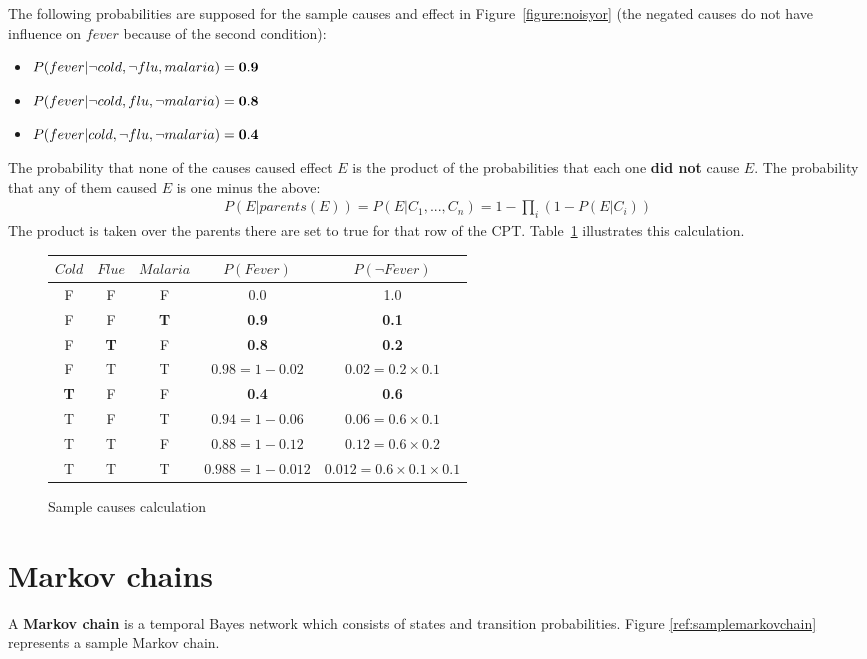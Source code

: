 \documentclass{report}
\begin{document}
The following probabilities are supposed for the sample causes and effect in Figure~\ref{figure:noisyor} (the negated causes do not have influence on $fever$ because of the second condition):
\begin{itemize}
\item $P(fever\vert \neg cold, \neg flu, malaria) = {\bf 0.9}$
\item $P(fever\vert \neg cold, flu, \neg malaria) = {\bf 0.8}$
\item $P(fever\vert cold, \neg flu, \neg malaria) = {\bf 0.4}$
\end{itemize}

The probability that none of the causes caused effect $E$ is the product of the probabilities that each one {\bf did not} cause $E$. The probability that any of them caused $E$ is one minus the above:
\begin{align*}
P(E\vert parents(E)) = P(E\vert C_1,...,C_n) = 1 - \prod_i (1 - P(E\vert C_i))
\end{align*}
The product is taken over the parents there are set to true for that row of the CPT. Table~\ref{table:samplecauses} illustrates this calculation.

\begin{figure}[h!]
\centering
\begin{tabular}{c|c|c||c||c}
$Cold$ & $Flue$ & $Malaria$ & $P(Fever)$ & $P(\neg Fever)$ \\
\hline
\hline
F & F & F & 0.0 & 1.0 \\
F & F & {\bf T} & {\bf 0.9} & {\bf 0.1} \\
F & {\bf T} & F & {\bf 0.8} & {\bf 0.2} \\
F & T & T & $0.98 = 1 - 0.02$ & $0.02 = 0.2 \times 0.1$ \\
{\bf T} & F & F & {\bf 0.4} & {\bf 0.6} \\
T & F & T & $0.94 = 1 - 0.06$ & $0.06 = 0.6 \times 0.1$ \\
T & T & F & $0.88 = 1 - 0.12$ & $0.12 = 0.6 \times 0.2$ \\
T & T & T & $0.988 = 1 - 0.012$ & $0.012 = 0.6 \times 0.1 \times 0.1$
\end{tabular}
\caption{Sample causes calculation}
\label{table:samplecauses}
\end{figure}


\section{Markov chains}
\label{ref:markovchains}
A {\bf Markov chain} is a temporal Bayes network which consists of states and transition probabilities. Figure \ref{ref:samplemarkovchain} represents a sample Markov chain.
\end{document}
